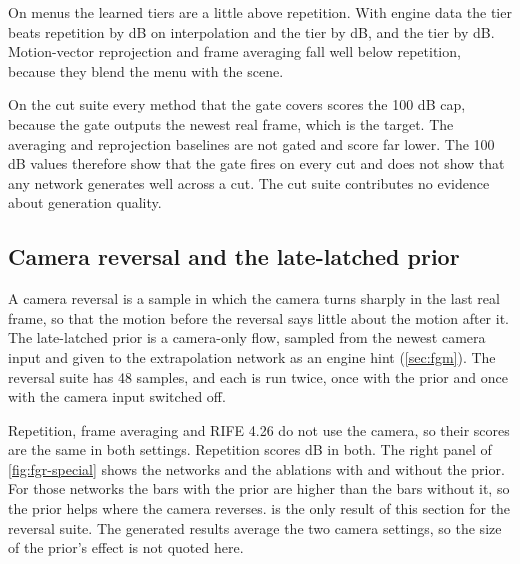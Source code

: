\Preliminary{} On menus the learned tiers are a little above repetition. With engine data the  tier beats repetition by  dB on interpolation and the  tier by  dB, and the  tier by  dB. Motion-vector reprojection and frame averaging fall well below repetition, because they blend the menu with the scene.

\Observation{} On the cut suite every method that the gate covers scores the 100 dB cap, because the gate outputs the newest real frame, which is the target. The averaging and reprojection baselines are not gated and score far lower. The 100 dB values therefore show that the gate fires on every cut and does not show that any network generates well across a cut. The cut suite contributes no evidence about generation quality.

\subsection{Camera reversal and the late-latched prior}\label{sec:fgr-reversal}

A camera reversal is a sample in which the camera turns sharply in the last real frame, so that the motion before the reversal says little about the motion after it. The late-latched prior is a camera-only flow, sampled from the newest camera input and given to the extrapolation network as an engine hint (\cref{sec:fgm}). The reversal suite has 48 samples, and each is run twice, once with the prior and once with the camera input switched off.

\Preliminary{} Repetition, frame averaging and RIFE 4.26 do not use the camera, so their scores are the same in both settings. Repetition scores  dB in both. The right panel of \cref{fig:fgr-special} shows the networks and the ablations with and without the prior. \Observation{} For those networks the bars with the prior are higher than the bars without it, so the prior helps where the camera reverses.  is the only result of this section for the reversal suite. The generated results average the two camera settings, so the size of the prior's effect is not quoted here.

